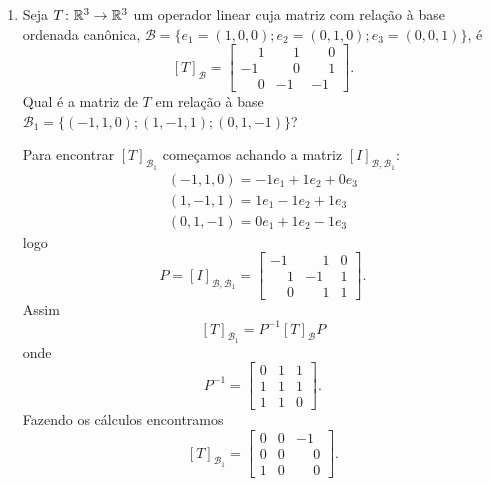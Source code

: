 \begin{exemplos}
\begin{enumerate}[label={\arabic*})]
        \item Seja $T \colon \mathbb{R}^3 \to \mathbb{R}^3$ um operador linear cuja matriz com relação à base ordenada canônica, $\mathcal{B} = \{e_1 = (1, 0, 0); e_2 = (0, 1, 0); e_3 = (0, 0 ,1)\}$, é
        \[
            [T]_\mathcal{B} = \begin{bmatrix}\phantom{-}1 & \phantom{-}1 & \phantom{-}0\\-1 & \phantom{-}0 & \phantom{-}1\\\phantom{-}0 & -1 & -1\end{bmatrix}.
        \]
        Qual é a matriz de $T$ em relação à base $\mathcal{B}_1 = \{(-1, 1, 0); (1, -1, 1); (0, 1, -1)\}$?
        \begin{solucao}
            Para encontrar $[T]_{\mathcal{B}_1}$ começamos achando a matriz $[I]_{\mathcal{B}, \mathcal{B}_1}$:
            \begin{align*}
                (-1, 1, 0) = -1e_1 + 1e_2 + 0e_3\\
                (1, -1, 1) = 1e_1 - 1e_2 + 1e_3\\
                (0, 1, -1) = 0e_1 + 1e_2 - 1e_3
            \end{align*}
            logo
            \[
                P = [I]_{\mathcal{B}, \mathcal{B}_1} = \begin{bmatrix}-1 & \phantom{-}1 & 0\\\phantom{-}1 & -1 & 1\\\phantom{-}0 & \phantom{-}1 & 1\end{bmatrix}.
            \]
            Assim
            \[
                [T]_{\mathcal{B}_1} = P^{-1}[T]_\mathcal{B}P
            \]
            onde
            \[
                P^{-1} = \begin{bmatrix}0 & 1 & 1\\1 & 1 & 1\\1 & 1 & 0\end{bmatrix}.
            \]
            Fazendo os cálculos encontramos
            \[
                [T]_{\mathcal{B}_1} = \begin{bmatrix}0 & 0 & -1\\0 & 0 & \phantom{-}0\\1 & 0 & \phantom{-}0\end{bmatrix}.
            \]
        \end{solucao}


\end{enumerate}
\end{exemplos}
